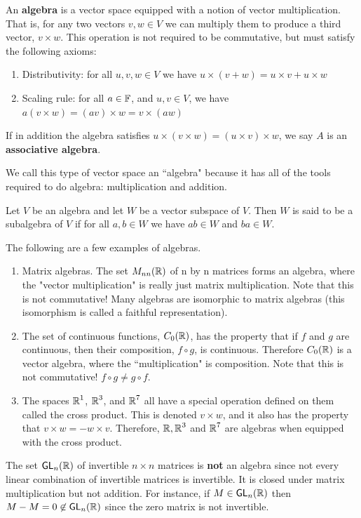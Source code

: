 \begin{defn}[Algebra] An \textbf{algebra} is a vector space equipped with a notion of vector multiplication. That is, for any two vectors $v,w \in V$ we can multiply them to produce a third vector, $v \times w$. This operation is not required to be commutative, but must satisfy the following axioms:
\begin{enumerate}
\item {
Distributivity: for all $u,v,w \in V$ we have $u\times(v+w) = u\times v + u\times w$
}
\item {
Scaling rule: for all $a \in \operatorname{\mathbb{F}}$, and $u,v\in V$, we have $a(v\times w) = (av) \times w = v\times (aw)$
}
\end{enumerate}
If in addition the algebra satisfies $u\times (v\times w) = (u\times v) \times w$, we say $A$ is an \textbf{associative algebra}.
\end{defn}
\begin{remark*}
    We call this type of vector space an ``algebra" because it has all of the tools required to do algebra: multiplication and addition.
\end{remark*}
\begin{defn}
    Let $V$ be an algebra and let $W$ be a vector subspace of $V$. Then $W$ is said to be a subalgebra of $V$ if for all $a,b\in W$ we have $ab\in W$ and $ba \in W$.
\end{defn}
\begin{example}
The following are a few examples of algebras.
\begin{enumerate}
\item {
Matrix algebras. The set $M_{nn}(\operatorname{\mathbb{R}})$ of n by n matrices forms an algebra, where the "vector multiplication" is really just matrix multiplication. Note that this is not commutative! Many algebras are isomorphic to matrix algebras (this isomorphism is called a faithful representation).
}
\item {
The set of continuous functions, $C_0(\operatorname{\mathbb{R}})$, has the property that if $f$ and $g$ are continuous, then their composition, $f \circ g$, is continuous. Therefore $C_0(\operatorname{\mathbb{R}})$ is a vector algebra, where the ``multiplication" is composition. Note that this is not commutative! $f\circ g \neq g \circ f$.
}
\item {
The spaces $\operatorname{\mathbb{R}}^1$, $\operatorname{\mathbb{R}}^3$, and $\operatorname{\mathbb{R}}^7$ all have a special operation defined on them called the cross product. This is denoted $v \times w$, and it also has the property that $v \times w = -w \times v$. Therefore, $\operatorname{\mathbb{R}}, \operatorname{\mathbb{R}}^3$ and $\operatorname{\mathbb{R}}^7$ are algebras when equipped with the cross product.
}
\end{enumerate}
\end{example}
\begin{example}
The set $\operatorname{\textsf{GL}}_n(\operatorname{\mathbb{R}})$ of invertible $n\times n$ matrices is \textbf{not} an algebra since not every linear combination of invertible matrices is invertible. It is closed under matrix multiplication but not addition. For instance, if $M\in \operatorname{\textsf{GL}}_n(\operatorname{\mathbb{R}})$ then $M-M=0\not\in \operatorname{\textsf{GL}}_n(\operatorname{\mathbb{R}})$ since the zero matrix is not invertible.

\end{example}

